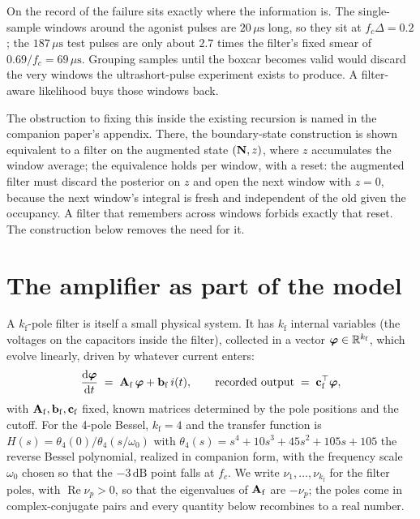 \documentclass[11pt]{article}
\begin{document}
On the record of \cite{moffatt2007} the failure sits exactly where the
information is. The single-sample windows around the agonist pulses are
$20\,\mu\mathrm{s}$ long, so they sit at $f_c\Delta = 0.2$; the
$187\,\mu\mathrm{s}$ test pulses are only about $2.7$ times the filter's
fixed smear of $0.69/f_c = 69\,\mu\mathrm{s}$. Grouping samples until the
boxcar becomes valid would discard the very windows the ultrashort-pulse
experiment exists to produce. A filter-aware likelihood buys those windows
back.

The obstruction to fixing this inside the existing recursion is named in
the companion paper's appendix. There, the boundary-state construction is
shown equivalent to a filter on the augmented state $(\mathbf{N}, z)$, where $z$
accumulates the window average; the equivalence holds per window, with a
reset: the augmented filter must discard the posterior on $z$ and open the
next window with $z = 0$, because the next window's integral is fresh and
independent of the old given the occupancy. A filter that remembers across
windows forbids exactly that reset. The construction below removes the
need for it.

\section{The amplifier as part of the model}

A $k_{\mathrm{f}}$-pole filter is itself a small physical system. It has
$k_{\mathrm{f}}$ internal variables (the voltages on the capacitors inside
the filter), collected in a vector $\bm{\varphi} \in \mathbb{R}^{k_{\mathrm{f}}}$,
which evolve linearly, driven by whatever current enters:
\begin{equation}
  \frac{\mathrm{d}\bm{\varphi}}{\mathrm{d}t} \;=\; \mathbf{A}_{\mathrm{f}}\,\bm{\varphi} + \mathbf{b}_{\mathrm{f}}\, i(t),
  \qquad
  \text{recorded output} \;=\; \mathbf{c}_{\mathrm{f}}^{\top}\bm{\varphi} ,
  \label{eq:filter-ss}
\end{equation}
with $\mathbf{A}_{\mathrm{f}},\mathbf{b}_{\mathrm{f}},\mathbf{c}_{\mathrm{f}}$ fixed, known matrices determined by the pole positions
and the cutoff. For the 4-pole Bessel, $k_{\mathrm{f}} = 4$ and the
transfer function is $H(s) = \theta_4(0)/\theta_4(s/\omega_0)$ with
$\theta_4(s) = s^4 + 10s^3 + 45s^2 + 105s + 105$ the reverse Bessel
polynomial, realized in companion form, with the frequency scale
$\omega_0$ chosen so that the $-3\,\mathrm{dB}$ point falls at $f_c$. We
write $\nu_1,\dots,\nu_{k_{\mathrm{f}}}$ for the filter poles, with
$\operatorname{Re}\nu_p > 0$, so that the eigenvalues of $\mathbf{A}_{\mathrm{f}}$ are
$-\nu_p$; the poles come in complex-conjugate pairs and every quantity
below recombines to a real number.
\end{document}
